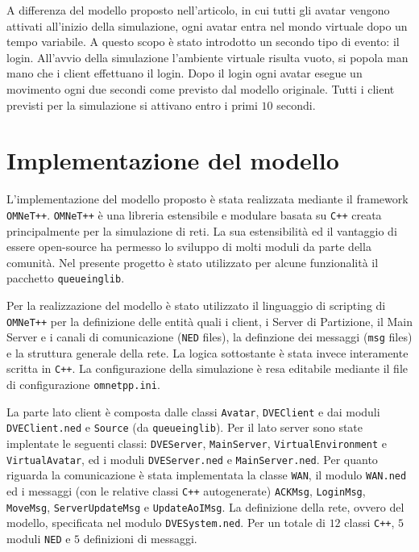\documentclass[a4paper, 11pt, oneside]{book}
\theoremstyle{definition}
\theoremstyle{remark}
\begin{document}
A differenza del modello proposto nell'articolo, in cui tutti gli avatar vengono
attivati all'inizio della simulazione, ogni avatar entra nel mondo virtuale
dopo un tempo variabile. A questo scopo è stato introdotto un secondo tipo
di evento: il login. All'avvio della simulazione l'ambiente virtuale
risulta vuoto, si popola man mano che i client effettuano il login.
Dopo il login ogni avatar esegue un movimento ogni due secondi come previsto
dal modello originale. Tutti i client previsti per la simulazione si
attivano entro i primi $10$ secondi.

\chapter{Implementazione del modello}\label{impl}
L'implementazione del modello proposto è stata realizzata mediante il framework
\texttt{OMNeT++}. \texttt{OMNeT++} è una libreria estensibile e modulare
basata su \texttt{C++} creata principalmente per la simulazione di reti.
La sua estensibilità ed il vantaggio di essere open-source ha permesso lo
sviluppo di molti moduli da parte della comunità. Nel presente progetto
è stato utilizzato per alcune funzionalità il pacchetto \texttt{queueinglib}.

Per la realizzazione del modello è stato utilizzato il linguaggio di
scripting di \texttt{OMNeT++} per la definizione delle entità quali i client,
i Server di Partizione, il Main Server e i canali di comunicazione
(\texttt{NED} files), la definzione dei messaggi (\texttt{msg} files) e
la struttura generale della rete. La logica sottostante è stata invece
interamente scritta in \texttt{C++}. La configurazione della simulazione
è resa editabile mediante il file di configurazione \texttt{omnetpp.ini}.

La parte lato client è composta dalle classi \texttt{Avatar}, \texttt{DVEClient}
e dai moduli \texttt{DVEClient.ned} e \texttt{Source} (da \texttt{queueinglib}).
Per il lato server sono state implentate le seguenti classi: \texttt{DVEServer},
\texttt{MainServer}, \texttt{VirtualEnvironment} e \texttt{VirtualAvatar}, ed
i moduli \texttt{DVEServer.ned} e \texttt{MainServer.ned}.
Per quanto riguarda la comunicazione è stata implementata la classe
\texttt{WAN}, il modulo \texttt{WAN.ned} ed i messaggi (con le relative classi
\texttt{C++} autogenerate) \texttt{ACKMsg}, \texttt{LoginMsg}, \texttt{MoveMsg},
\texttt{ServerUpdateMsg} e \texttt{UpdateAoIMsg}. La definizione della rete,
ovvero del modello, specificata nel modulo \texttt{DVESystem.ned}.
Per un totale di $12$ classi \texttt{C++}, $5$ moduli \texttt{NED} e
$5$ definizioni di messaggi.
\end{document}
